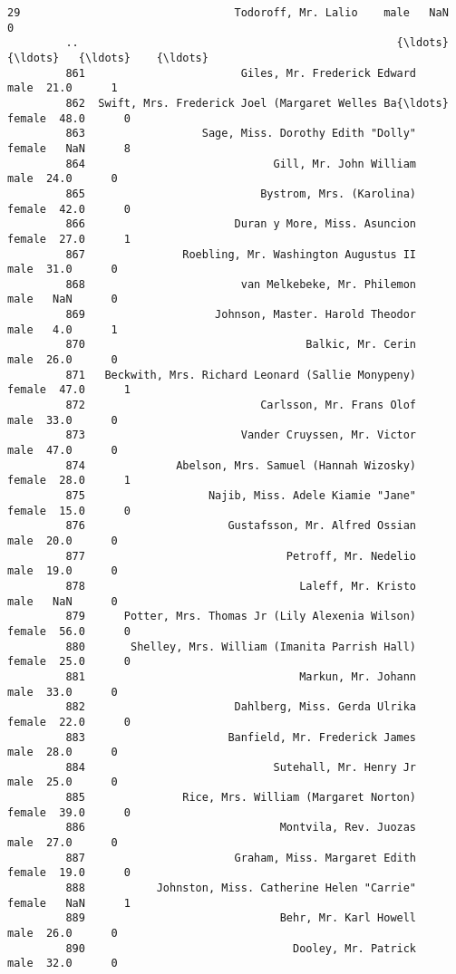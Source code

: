 \documentclass[11pt]{article}
\begin{document}
\begin{Verbatim}[commandchars=\\\{\}]
         29                                 Todoroff, Mr. Lalio    male   NaN      0   
         ..                                                 {\ldots}     {\ldots}   {\ldots}    {\ldots}   
         861                        Giles, Mr. Frederick Edward    male  21.0      1   
         862  Swift, Mrs. Frederick Joel (Margaret Welles Ba{\ldots}  female  48.0      0   
         863                  Sage, Miss. Dorothy Edith "Dolly"  female   NaN      8   
         864                             Gill, Mr. John William    male  24.0      0   
         865                           Bystrom, Mrs. (Karolina)  female  42.0      0   
         866                       Duran y More, Miss. Asuncion  female  27.0      1   
         867               Roebling, Mr. Washington Augustus II    male  31.0      0   
         868                        van Melkebeke, Mr. Philemon    male   NaN      0   
         869                    Johnson, Master. Harold Theodor    male   4.0      1   
         870                                  Balkic, Mr. Cerin    male  26.0      0   
         871   Beckwith, Mrs. Richard Leonard (Sallie Monypeny)  female  47.0      1   
         872                           Carlsson, Mr. Frans Olof    male  33.0      0   
         873                        Vander Cruyssen, Mr. Victor    male  47.0      0   
         874              Abelson, Mrs. Samuel (Hannah Wizosky)  female  28.0      1   
         875                   Najib, Miss. Adele Kiamie "Jane"  female  15.0      0   
         876                      Gustafsson, Mr. Alfred Ossian    male  20.0      0   
         877                               Petroff, Mr. Nedelio    male  19.0      0   
         878                                 Laleff, Mr. Kristo    male   NaN      0   
         879      Potter, Mrs. Thomas Jr (Lily Alexenia Wilson)  female  56.0      0   
         880       Shelley, Mrs. William (Imanita Parrish Hall)  female  25.0      0   
         881                                 Markun, Mr. Johann    male  33.0      0   
         882                       Dahlberg, Miss. Gerda Ulrika  female  22.0      0   
         883                      Banfield, Mr. Frederick James    male  28.0      0   
         884                             Sutehall, Mr. Henry Jr    male  25.0      0   
         885               Rice, Mrs. William (Margaret Norton)  female  39.0      0   
         886                              Montvila, Rev. Juozas    male  27.0      0   
         887                       Graham, Miss. Margaret Edith  female  19.0      0   
         888           Johnston, Miss. Catherine Helen "Carrie"  female   NaN      1   
         889                              Behr, Mr. Karl Howell    male  26.0      0   
         890                                Dooley, Mr. Patrick    male  32.0      0   
         

\end{Verbatim}
\end{document}
